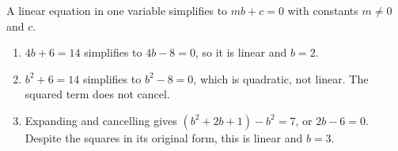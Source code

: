 A linear equation in one variable simplifies to $mb+c=0$ with constants $m\ne0$ and $c$.
\begin{enumerate}
\item $4b+6=14$ simplifies to $4b-8=0$, so it is linear and $\boxed{b=2}$.
\item $b^2+6=14$ simplifies to $b^2-8=0$, which is quadratic, not linear. The squared term does not cancel.
\item Expanding and cancelling gives $(b^2+2b+1)-b^2=7$, or $2b-6=0$. Despite the squares in its original form, this is linear and $\boxed{b=3}$.
\end{enumerate}

